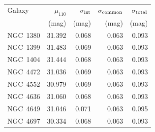 \begin{tabular}{lrrrr}
\toprule
Galaxy & $\mu_{110}$ & $\sigma_{\rm int}$ & $\sigma_{\rm common}$ & $\sigma_{\rm total}$ \\
 & (mag) & (mag) & (mag) & (mag) \\
\midrule
NGC~1380 & 31.392 & 0.068 & 0.063 & 0.093 \\
NGC~1399 & 31.483 & 0.069 & 0.063 & 0.093 \\
NGC~1404 & 31.444 & 0.068 & 0.063 & 0.093 \\
NGC~4472 & 31.036 & 0.069 & 0.063 & 0.093 \\
NGC~4552 & 30.979 & 0.069 & 0.063 & 0.093 \\
NGC~4636 & 31.060 & 0.068 & 0.063 & 0.093 \\
NGC~4649 & 31.046 & 0.071 & 0.063 & 0.095 \\
NGC~4697 & 30.334 & 0.068 & 0.063 & 0.093 \\
\bottomrule
\end{tabular}
